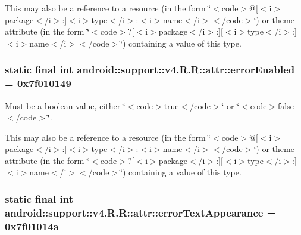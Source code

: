 This may also be a reference to a resource (in the form \char`\"{}$<$code$>$@\mbox{[}$<$i$>$package$<$/i$>$:\mbox{]}$<$i$>$type$<$/i$>$:$<$i$>$name$<$/i$>$$<$/code$>$\char`\"{}) or theme attribute (in the form \char`\"{}$<$code$>$?\mbox{[}$<$i$>$package$<$/i$>$:\mbox{]}\mbox{[}$<$i$>$type$<$/i$>$:\mbox{]}$<$i$>$name$<$/i$>$$<$/code$>$\char`\"{}) containing a value of this type. \hypertarget{classandroid_1_1support_1_1v4_1_1_r_1_1attr_198ced92428533a2ae62b0202ccbd099}{
\subsubsection[{errorEnabled}]{\setlength{\rightskip}{0pt plus 5cm}static final int android::support::v4.R.R::attr::errorEnabled = 0x7f010149}}
\label{classandroid_1_1support_1_1v4_1_1_r_1_1attr_198ced92428533a2ae62b0202ccbd099}


Must be a boolean value, either \char`\"{}$<$code$>$true$<$/code$>$\char`\"{} or \char`\"{}$<$code$>$false$<$/code$>$\char`\"{}. 

This may also be a reference to a resource (in the form \char`\"{}$<$code$>$@\mbox{[}$<$i$>$package$<$/i$>$:\mbox{]}$<$i$>$type$<$/i$>$:$<$i$>$name$<$/i$>$$<$/code$>$\char`\"{}) or theme attribute (in the form \char`\"{}$<$code$>$?\mbox{[}$<$i$>$package$<$/i$>$:\mbox{]}\mbox{[}$<$i$>$type$<$/i$>$:\mbox{]}$<$i$>$name$<$/i$>$$<$/code$>$\char`\"{}) containing a value of this type. \hypertarget{classandroid_1_1support_1_1v4_1_1_r_1_1attr_7a8ba1873ddf3d6cacab520516ac979a}{
\subsubsection[{errorTextAppearance}]{\setlength{\rightskip}{0pt plus 5cm}static final int android::support::v4.R.R::attr::errorTextAppearance = 0x7f01014a}}
\label{classandroid_1_1support_1_1v4_1_1_r_1_1attr_7a8ba1873ddf3d6cacab520516ac979a}


